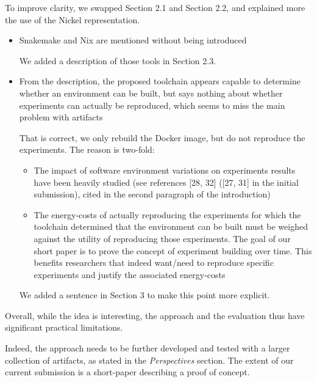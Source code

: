 \documentclass[%
	11pt,
	final,
]{article}
\begin{document}
\begin{itemize}
\begin{itemize}
\begin{review-answer}
  To improve clarity, we swapped Section 2.1 and Section 2.2, and explained more the use of the Nickel representation.
\end{review-answer}
   \begin{itemize}
    \item Snakemake and Nix are mentioned without being introduced
      \begin{review-answer}
        We added a description of those tools in Section 2.3.
      \end{review-answer}
    \item From the description, the proposed toolchain appears capable to determine whether an environment can be built, but says nothing about whether experiments can actually be reproduced, which seems to miss the main problem with artifacts
      \begin{review-answer}
        That is correct, we only rebuild the Docker image, but do not reproduce the experiments.
        The reason is two-fold:
        \begin{itemize}
        \item The impact of software environment variations on experiments results have been heavily studied (see references [28, 32] ([27, 31] in the initial submission), cited in the second paragraph of the introduction)
        \item The energy-costs of actually reproducing the experiments for which the toolchain determined that the environment can be built must be weighed against the utility of reproducing those experiments.
          The goal of our short paper is to prove the concept of experiment building over time.
          This benefits researchers that indeed want/need to reproduce specific experiments and justify the associated energy-costs
        \end{itemize}


        We added a sentence in Section 3 to make this point more explicit.
      \end{review-answer}
    \end{itemize}
    \end{itemize}
\end{itemize}

Overall, while the idea is interesting, the approach and the evaluation thus have significant practical limitations.

\begin{review-answer}
  Indeed, the approach needs to be further developed and tested with a larger collection of artifacts, as stated in the \emph{Perspectives} section.
  The extent of our current submission is a short-paper describing a proof of concept.
\end{review-answer}
\end{document}
